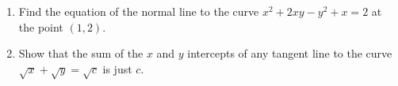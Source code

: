 \begin{enumerate}
\begin{multicols}{3}
\begin{enumerate}
\begin{center}
            \end{center}
    \end{enumerate}
    \end{multicols}
  \item Find the equation of the normal line to the curve $ x^2 + 2xy - y^2 + x = 2 $ at the point $ (1, 2) $.
  \item Show that the sum of the $ x $ and $ y $ intercepts of any tangent line to the curve $ \sqrt{x} + \sqrt{y} = \sqrt{c} $
        is just $ c $.
\end{enumerate}
